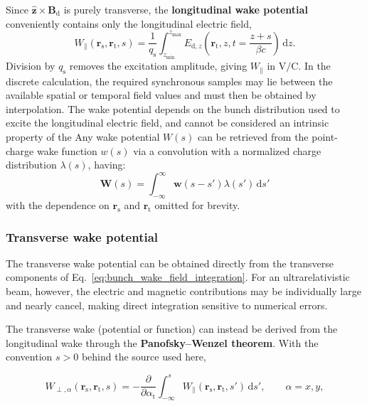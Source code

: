 Since $\widehat{\mathbf{z}}\times\mathbf{B}_{\mathrm{d}}$ is purely transverse, the \textbf{longitudinal wake potential} conveniently contains only the longitudinal electric field,
%
\begin{equation}
W_{\parallel}
\left(
\mathbf{r}_{\mathrm{s}},\mathbf{r}_{\mathrm{t}},s
\right)
=
\frac{1}{q_{\mathrm{s}}}
\int_{z_{\min}}^{z_{\max}}
E_{\mathrm{d},z}
\left(
\mathbf{r}_{\mathrm{t}},z,
t=\frac{z+s}{\beta c}
\right)
\,\mathrm{d}z.
\label{eq:longitudinal_wake_field_integration}
\end{equation}
%
Division by $q_{\mathrm{s}}$ removes the excitation amplitude, giving $W_{\parallel}$ in $\mathrm{V/C}$. In the discrete calculation, the required synchronous samples may lie between the available spatial or temporal field values and must then be obtained by interpolation. The wake potential depends on the bunch distribution used to excite the longitudinal electric field, and cannot be considered an intrinsic property of the  Any wake potential $W(s)$ can be retrieved from the point-charge wake function $w(s)$ via a convolution with a normalized charge distribution $\lambda(s)$, having: 
%
\begin{equation}
\mathbf{W}(s)=\int_{-\infty}^{\infty} \boldsymbol{w}(s-s')\lambda(s')\,\mathrm{d}s' 
\end{equation}
%
with the dependence on $\mathbf{r}_{\mathrm{s}}$ and $\mathbf{r}_{\mathrm{t}}$ omitted for brevity.

\subsubsection{Transverse wake potential}
\label{sec:transverse_wake_integration}

The transverse wake potential can be obtained directly from the transverse components of Eq.~\eqref{eq:bunch_wake_field_integration}. For an ultrarelativistic beam, however, the electric and magnetic contributions may be individually large and nearly cancel, making direct integration sensitive to numerical errors.

The transverse wake (potential or function) can instead be derived from the longitudinal wake through the \textbf{Panofsky--Wenzel theorem}. With the convention $s>0$ behind the source used here,

\begin{equation}
W_{\perp,\alpha}
\left(
\mathbf{r}_{\mathrm{s}},\mathbf{r}_{\mathrm{t}},s
\right)
= -\frac{\partial}{\partial \alpha_{\mathrm{t}}}
\int_{-\infty}^{s}
W_{\parallel}
\left(
\mathbf{r}_{\mathrm{s}},\mathbf{r}_{\mathrm{t}},s'
\right)
\,\mathrm{d}s',
\qquad
\alpha=x,y,
\label{eq:panofsky_wenzel_wake_potential}
\end{equation}

